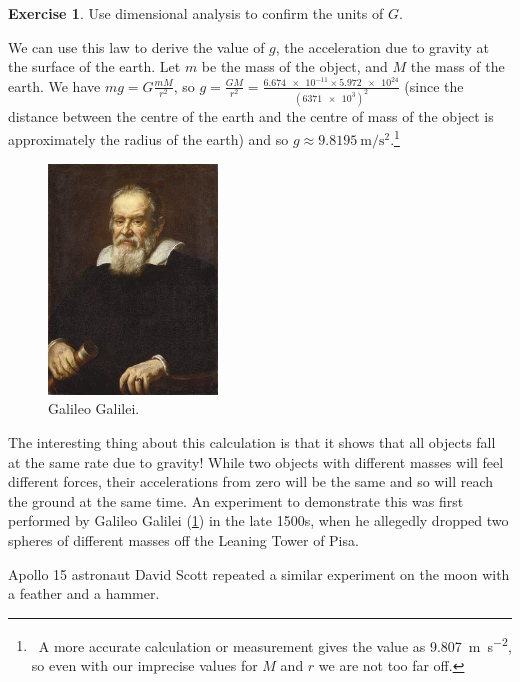 \documentclass[a4paper]{amsbook}
\theoremstyle{definition}
\newtheorem{exercise}{Exercise}
\numberwithin{exercise}{chapter}
\numberwithin{exercise}{chapter}
\newcommand\capcite[1]{}
\begin{document}
\begin{exercise}
  Use dimensional analysis to confirm the units of $ G $.
\end{exercise}

We can use this law to derive the value of $ g $, the acceleration due to gravity at the surface of the earth. Let $ m $ be the mass of the object, and $ M $ the
mass of the earth. We have $ mg = G\frac{mM}{r^2} $, so $ g = \frac{GM}{r^2} = \frac{\num{6.674e-11} \times \num{5.972e24}}{(\num{6371e3})^2} $
(since the distance between the centre of the earth and the centre of mass of the object is approximately the radius of the earth) and
so $ g \approx \SI{9.8195}{\metre\per\second\squared} $.\footnote{~A more accurate calculation or measurement gives the value
as \SI{9.807}{\metre\per\second\squared}, so even with our imprecise values for $ M $ and $ r $ we are not too far off.}

\begin{figure}
  \centering
  \includegraphics[width=0.4\textwidth]{galileo}
  \caption{Galileo Galilei. \capcite{https://media1.britannica.com/eb-media/58/95758-004-BD98B43B.jpg}\label{fig:galileo}}
\end{figure}

The interesting thing about this calculation is that it shows that all objects fall at the same rate due to gravity! While two objects with
different masses will feel different forces, their accelerations from zero will be the same and so will reach the ground at the same time. An
experiment to demonstrate this was first performed by Galileo Galilei (\cref{fig:galileo}) in the late 1500s, when he allegedly dropped two
spheres of different masses off the Leaning Tower of Pisa.

Apollo 15 astronaut David Scott repeated a similar experiment on the moon with a feather and a hammer.
\end{document}

